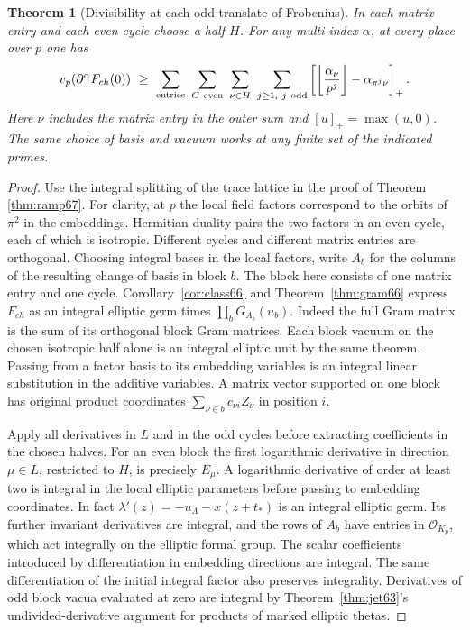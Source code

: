 \documentclass[a4paper,11pt]{article}
\newtheorem{theorem}[proposition]{Theorem}
\theoremstyle{definition}
\theoremstyle{remark}
\numberwithin{equation}{section}
\begin{document}
\begin{theorem}[Divisibility at each odd translate of Frobenius]
\label{thm:direct76}
In each matrix entry and each even cycle choose a half \(H\).
For any multi-index \(\alpha\), at every place over \(p\) one has
\begin{equation}
 v_p(\partial^\alpha F_{ch}(0))\ \ge\
 \sum_{\text{\rm entries}}\ \sum_{C\ {\rm even}}\ 
 \sum_{\nu\in H}\ \sum_{j\ge1,\ j\ {\rm odd}}
 \left[\left\lfloor\frac{\alpha_\nu}{p^j}\right\rfloor
                                 -\alpha_{\pi^j\nu}\right]_+ .
 \label{eq:direct76}
\end{equation}
Here \(\nu\) includes the matrix entry in the outer sum and
\([u]_+=\max(u,0)\). The same choice of basis and vacuum
works at any finite set of the indicated primes.
\end{theorem}
\begin{proof}
Use the integral splitting of the trace lattice in the proof of
Theorem \ref{thm:ramp67}.
For clarity, at \(p\) the local field factors correspond to the
orbits of \(\pi^2\) in the embeddings. Hermitian duality pairs
the two factors in an even cycle, each of which is isotropic.
Different cycles and different matrix entries are orthogonal.
Choosing integral bases in the local factors, write \(A_b\)
for the columns of the resulting change of basis in block \(b\).
The block here consists of one matrix entry and one cycle.
Corollary~\ref{cor:class66} and Theorem~\ref{thm:gram66} express
\(F_{ch}\) as an integral elliptic germ times
\(\prod_b G_{A_b}(u_b)\). Indeed the full Gram matrix is the
sum of its orthogonal block Gram matrices. Each block vacuum
on the chosen isotropic half alone is an integral elliptic
unit by the same theorem. Passing from a factor basis to its
embedding variables is an integral linear substitution in
the additive variables. A matrix vector supported on one
block has original product coordinates
\(\sum_{\nu\in b}c_{\nu i} Z_\nu\) in position \(i\).

Apply all derivatives in \(L\) and in the odd cycles before
extracting coefficients in the chosen halves. For an even
block the first logarithmic derivative in direction \(\mu\in L\),
restricted to \(H\), is precisely \(E_\mu\). A logarithmic
derivative of order at least two is integral in the local
elliptic parameters before passing to embedding coordinates.
In fact \(\lambda'(z)=-u_\Lambda-x(z+t_*)\) is an integral
elliptic germ. Its further invariant derivatives are integral,
and the rows of \(A_b\) have entries in \(\mathcal O_{K_p}\),
which act integrally on the elliptic formal group. The scalar
coefficients introduced by differentiation in embedding
directions are integral. The same differentiation of the
initial integral factor also preserves integrality. Derivatives
of odd block vacua evaluated at zero are integral by
Theorem~\ref{thm:jet63}'s undivided-derivative argument for
products of marked elliptic thetas.


\end{proof}
\end{document}
